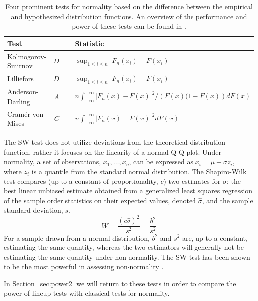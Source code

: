 \documentclass[12pt]{article}\usepackage[]{graphicx}\usepackage[]{color}
\begin{document}
\begin{table}
\centering
\caption{\label{tab:tests} Four prominent tests for normality based on the difference between the empirical and hypothesized distribution functions. An overview of the performance and power of these tests can be found in \citet{stephens:1974}.}
\begin{tabular}{lrl}\hline
Test && Statistic\\\hline\hline
Kolmogorov-Smirnov & $D =$ & $ \sup_{1 \le i \le n} \left | F_n(x_i) - F(x_i)\right|$ \\
Lilliefors & $D =$ & $ \sup_{1 \le i \le n} \left | F_n(x_i) - F(x_i)\right|$ \\
Anderson-Darling & $A =$ & $ n \int_{-\infty}^{+\infty} \left | F_n(x) - F(x)\right|^2/\left(F(x)(1 - F(x)\right) dF(x)$\\
Cram\'{e}r-von-Mises & $C =$ & $n \int_{-\infty}^{+\infty} \left | F_n(x) - F(x)\right|^2 dF(x)$ \\\hline
\end{tabular}
\end{table}
\afterpage{\clearpage}

%

The SW test \cite[SW-test,][]{Shapiro:1965kt} does not utilize deviations from the theoretical distribution function, rather it focuses on the linearity of a normal Q-Q plot. Under normality, a set of observations, $x_1, \ldots, x_n$, can be expressed as $x_i = \mu + \sigma z_i$, where $z_i$ is a quantile from the standard normal distribution. The Shapiro-Wilk test compares (up to a constant of proportionality, $c$) two estimates for $\sigma$: the best linear unbiased estimate obtained from a generalized least squares regression of the sample order statistics on their expected values, denoted $\widehat{\sigma}$, and the sample standard deviation, $s$.
\[
  W = \frac{(c \widehat{\sigma})^2}{s^2} = \frac{b^2}{s^2}
\]
For a sample drawn from a normal distribution, $b^2$ and $s^2$ are, up to a constant, estimating the same quantity, whereas the two estimators will generally not be estimating the same quantity under non-normality. The SW test has been shown to be the most powerful in assessing non-normality \citep{stephens:1974, razali:2011}.

In Section~\ref{sec:power2} we will return to these tests in order to compare the power of lineup tests with classical tests for normality.
\end{document}
